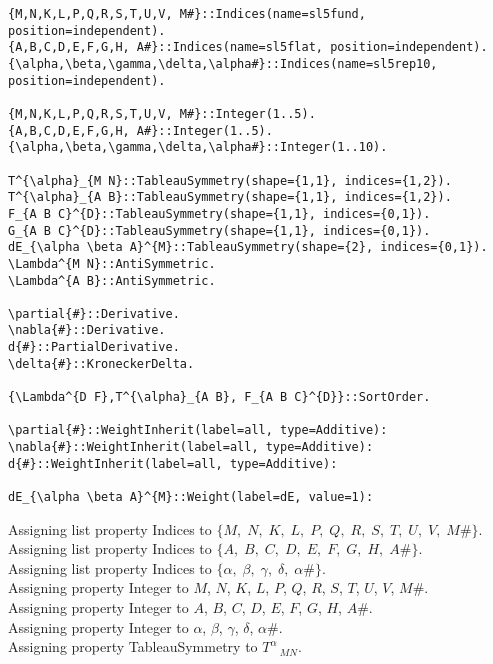 \documentclass[11pt]{article}
\begin{document}
{\color[named]{Blue}\begin{verbatim}
{M,N,K,L,P,Q,R,S,T,U,V, M#}::Indices(name=sl5fund, position=independent).
{A,B,C,D,E,F,G,H, A#}::Indices(name=sl5flat, position=independent).
{\alpha,\beta,\gamma,\delta,\alpha#}::Indices(name=sl5rep10, position=independent).

{M,N,K,L,P,Q,R,S,T,U,V, M#}::Integer(1..5).
{A,B,C,D,E,F,G,H, A#}::Integer(1..5).
{\alpha,\beta,\gamma,\delta,\alpha#}::Integer(1..10).

T^{\alpha}_{M N}::TableauSymmetry(shape={1,1}, indices={1,2}).
T^{\alpha}_{A B}::TableauSymmetry(shape={1,1}, indices={1,2}).
F_{A B C}^{D}::TableauSymmetry(shape={1,1}, indices={0,1}).
G_{A B C}^{D}::TableauSymmetry(shape={1,1}, indices={0,1}).
dE_{\alpha \beta A}^{M}::TableauSymmetry(shape={2}, indices={0,1}).
\Lambda^{M N}::AntiSymmetric.
\Lambda^{A B}::AntiSymmetric.

\partial{#}::Derivative.
\nabla{#}::Derivative.
d{#}::PartialDerivative.
\delta{#}::KroneckerDelta.

{\Lambda^{D F},T^{\alpha}_{A B}, F_{A B C}^{D}}::SortOrder.

\partial{#}::WeightInherit(label=all, type=Additive):
\nabla{#}::WeightInherit(label=all, type=Additive):
d{#}::WeightInherit(label=all, type=Additive):

dE_{\alpha \beta A}^{M}::Weight(label=dE, value=1):
\end{verbatim}}
Assigning list property Indices to $\{M,\; N,\; K,\; L,\; P,\; Q,\; R,\; S,\; T,\; U,\; V,\; M\#\}$.
\\
Assigning list property Indices to $\{A,\; B,\; C,\; D,\; E,\; F,\; G,\; H,\; A\#\}$.
\\
Assigning list property Indices to $\{\alpha,\; \beta,\; \gamma,\; \delta,\; \alpha\#\}$.
\\
Assigning property Integer to $M$, $N$, $K$, $L$, $P$, $Q$, $R$, $S$, $T$, $U$, $V$, $M\#$.
\\
Assigning property Integer to $A$, $B$, $C$, $D$, $E$, $F$, $G$, $H$, $A\#$.
\\
Assigning property Integer to $\alpha$, $\beta$, $\gamma$, $\delta$, $\alpha\#$.
\\
Assigning property TableauSymmetry to ${T}^{\alpha}\,_{M N}$.
\\
\end{document}
